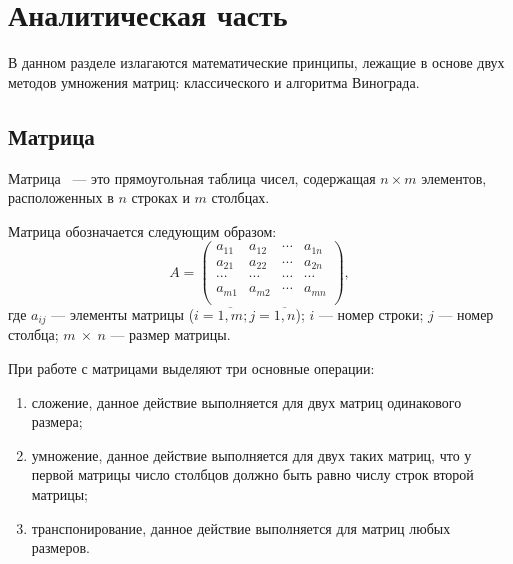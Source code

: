 \chapter{Аналитическая часть}

В данном разделе излагаются математические принципы, лежащие в основе двух методов умножения матриц: классического и алгоритма Винограда.

\section{Матрица}
Матрица~\cite{matrix_def} — это прямоугольная таблица чисел, содержащая \(n \times m\) элементов, расположенных в \(n\) строках и \(m\) столбцах.

Матрица обозначается следующим образом:
\begin{equation}
	A=\begin{pmatrix}
		a_{11} & a_{12} & \cdots & a_{1n} \\
		a_{21} & a_{22} & \cdots & a_{2n} \\
		\cdots & \cdots & \cdots & \cdots \\
		a_{m1} & a_{m2} & \cdots & a_{mn} \\
	\end{pmatrix},
\end{equation}
\noindent где $a_{ij}$ --- элементы матрицы ($i=\overline{1,m}; j=\overline{1,n}$); $i$ --- номер строки; $j$ --- номер столбца; $m~\times~n$ --- размер матрицы.

При работе с матрицами выделяют три основные операции:
\begin{enumerate}
	\item сложение, данное действие выполняется для двух матриц одинакового размера;
	\item умножение, данное действие выполняется для двух таких матриц, что у первой матрицы число столбцов должно быть равно числу строк второй матрицы;
	\item транспонирование, данное действие выполняется для матриц любых размеров.
\end{enumerate}


